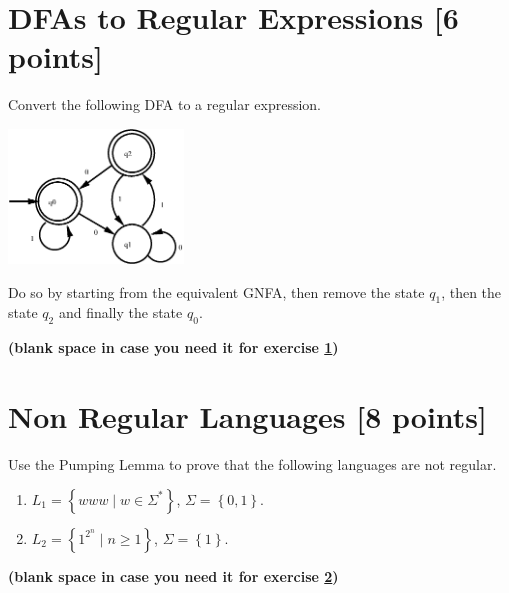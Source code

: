 \documentclass[letterpaper,11pt,twoside]{article}
\providecommand{\set}[1]{\ensuremath{\left\{#1\right\}}\xspace}
\begin{document}
\section{DFAs to Regular Expressions [6 points]}\label{conversion}
Convert the following DFA to a regular expression.
\begin{center}
{
\includegraphics[width=0.35\textwidth]{figs/dfa4.eps}
}
\end{center}
Do so by starting from the equivalent GNFA, then remove the state $q_1$, then the state $q_2$ and finally the state $q_0$.


\newpage
\begin{center}
\textbf{(blank space in case you need it for exercise \ref{conversion})}
\end{center}





\newpage
\section{Non Regular Languages [8 points]}\label{non-regular}
Use the Pumping Lemma to prove that the following languages are not regular.
\begin{enumerate}[label=(\roman*)]
\item $L_1 = \set{www \mid w\in\Sigma^*}$, $\Sigma = \set{0, 1}$.
\item $L_2 = \set{1^{2^n} \mid n\ge 1}$, $\Sigma = \set{1}$.
\end{enumerate}


\newpage
\begin{center}
\textbf{(blank space in case you need it for exercise \ref{non-regular})}
\end{center}
\end{document}
